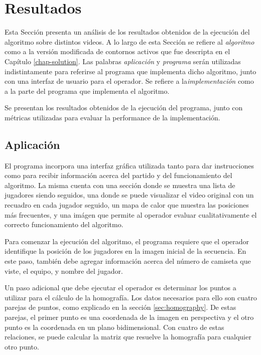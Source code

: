 \chapter{Resultados}
\label{chap-results}

Esta Sección presenta un análisis de los resultados obtenidos de la ejecución
del algoritmo sobre distintos videos. A lo largo de esta Sección se refiere al
\textit{algoritmo} como a la versión modificada de contornos activos que fue
descripta en el Capítulo \ref{chap-solution}. Las palabras \textit{aplicación}
y \textit{programa} serán utilizadas indistintamente para referirse al programa
que implementa dicho algoritmo, junto con una interfaz de usuario para el
operador. Se refiere a la\textit{implementación} como a la parte del programa
que implementa el algoritmo.

Se presentan los resultados obtenidos de la ejecución del programa, junto con
métricas utilizadas para evaluar la performance de la implementación.

\section{Aplicación}

El programa incorpora una interfaz gráfica utilizada tanto para dar
instrucciones como para recibir información acerca del partido y del
funcionamiento del algoritmo. La misma cuenta con una sección donde se muestra
una lista de jugadores siendo seguidos, una donde se puede visualizar el video
original con un recuadro en cada jugador seguido, un mapa de calor que muestra
las posiciones más frecuentes, y una imágen que permite al operador evaluar
cualitativamente el correcto funcionamiento del algoritmo.

Para comenzar la ejecución del algoritmo, el programa requiere que el operador
identifique la posición de los jugadores en la imagen inicial de la secuencia.
En este paso, también debe agregar información acerca del número de camiseta
que viste, el equipo, y nombre del jugador.

Un paso adicional que debe ejecutar el operador es determinar los puntos a
utilizar para el cálculo de la homografía. Los datos necesarios para ello son
cuatro parejas de puntos, como explicado en la sección \ref{sec:homography}. De
estas parejas, el primer punto es una coordenada de la imagen en perspectiva y
el otro punto es la coordenada en un plano bidimensional. Con cuatro de estas
relaciones, se puede calcular la matriz que resuelve la homografía para
cualquier otro punto.

